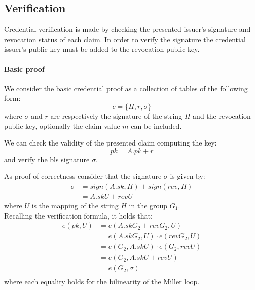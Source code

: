 \subsection{Verification}

Credential verification is made by checking the presented issuer's
signature and revocation status of each claim. In order to verify the
signature the credential issuer's public key must be added to the
revocation public key.

\paragraph{Basic proof}

We consider the basic credential proof as a collection of tables of
the following form:
\begin{equation*}
    c = \{H, r, \sigma \}
\end{equation*}
where $\sigma$ and $r$ are respectively the signature of the string
$H$ and the revocation public key, optionally the claim value $m$ can
be included.

We can check the validity of the presented claim computing the key:
\begin{equation*}
    pk = A.pk + r
\end{equation*}
and verify the bls signature $\sigma$.

As proof of correctness consider that the signature $\sigma$ is given
by:
\begin{equation*}
\begin{split}
    \sigma &= sign(A.sk, H) + sign(rev, H) \\
     &= A.sk U + rev U
\end{split}
\end{equation*}
where $U$ is the mapping of the string $H$ in the group $G_1$.\\
Recalling the verification formula, it holds that:
\begin{equation*}
\begin{split}
 e(pk, U) &= e(A.skG_2 + revG_2, U) \\
 &= e(A.skG_2, U) \cdot e(revG_2, U) \\
 &= e(G_2, A.sk U) \cdot e(G_2, rev U) \\
 &= e(G_2, A.sk U + rev U) \\
 &= e(G_2, \sigma) \\
\end{split}
\end{equation*}
where each equality holds for the bilinearity of the Miller loop.

